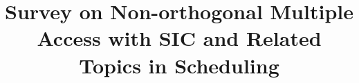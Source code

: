\documentclass[conference,a4paper]{IEEEtran}
\begin{document}
\title{Survey on Non-orthogonal Multiple Access with SIC and Related Topics in Scheduling}

\author{
\\
}
\maketitle

\begin{abstract}

\end{abstract}









\end{document}

